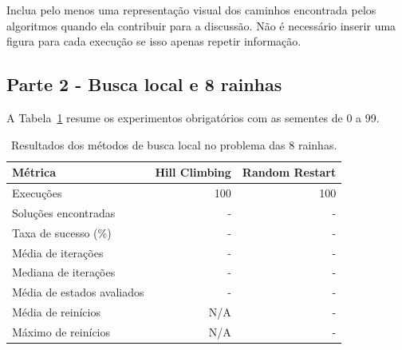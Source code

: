 \documentclass[12pt]{article}
\begin{document}
\begin{table}[H]
\centering
\caption{Resultados dos algoritmos de busca no mapa de teste.}
\label{tab:grid}
\end{table}

Inclua pelo menos uma representação visual dos caminhos encontrada pelos algoritmos quando ela contribuir para a discussão. Não é necessário inserir uma figura para cada execução se isso apenas repetir informação.

\subsection{Parte 2 - Busca local e 8 rainhas}
A Tabela~\ref{tab:queens} resume os experimentos obrigatórios com as sementes de 0 a 99.

\begin{table}[H]
\centering
\caption{Resultados dos métodos de busca local no problema das 8 rainhas.}
\label{tab:queens}
\begin{tabularx}{\textwidth}{Xrr}
\toprule
Métrica & Hill Climbing & Random Restart \\
\midrule
Execuções & 100 & 100 \\
Soluções encontradas & - & - \\
Taxa de sucesso (\%) & - & - \\
Média de iterações & - & - \\
Mediana de iterações & - & - \\
Média de estados avaliados & - & - \\
Média de reinícios & N/A & - \\
Máximo de reinícios & N/A & - \\
\bottomrule
\end{tabularx}
\end{table}
\end{document}
